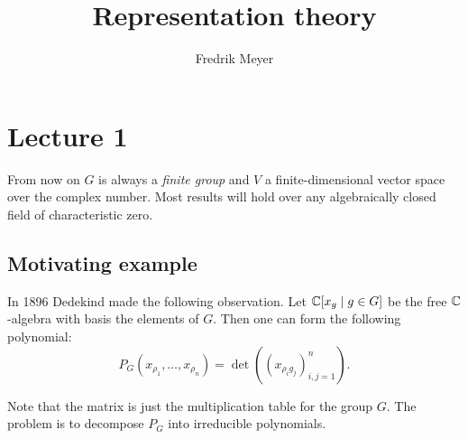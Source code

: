 \documentclass[11pt, english]{article}
\title{Representation theory}
\author{Fredrik Meyer}
\date{}
\begin{document}
\maketitle

\section{Lecture 1}

From now on $G$ is always a \emph{finite group} and $V$ a finite-dimensional vector space over the complex number. Most results will hold over any algebraically closed field of characteristic zero.

\subsection{Motivating example}

In 1896 Dedekind made the following observation. Let $\mathbb{C}[x_g \mid g \in G]$ be the free $\mathbb{C}$-algebra with basis the elements of $G$. Then one can form the following polynomial:
\[
P_G(x_{\rho_1},\ldots,x_{\rho_n}) = \det \left( (x_{\rho_i g_j})_{i,j=1}^n \right).
\]

Note that the matrix is just the multiplication table for the group $G$. The problem is to decompose $P_G$ into irreducible polynomials. 
\end{document}
